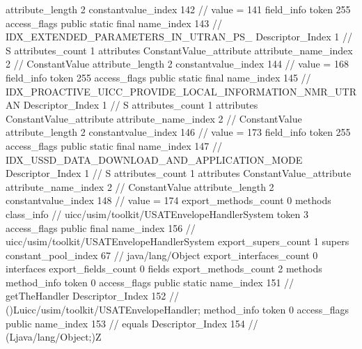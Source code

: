 {{{{{{{					attribute_length	2
					constantvalue_index	142		// value = 141
				}
				}
			}
			field_info {
				token	255
				access_flags	public static final
				name_index	143		// IDX_EXTENDED_PARAMETERS_IN_UTRAN_PS_
				Descriptor_Index	1		// S
				attributes_count	1
				attributes {
				ConstantValue_attribute {
					attribute_name_index	2		// ConstantValue
					attribute_length	2
					constantvalue_index	144		// value = 168
				}
				}
			}
			field_info {
				token	255
				access_flags	public static final
				name_index	145		// IDX_PROACTIVE_UICC_PROVIDE_LOCAL_INFORMATION_NMR_UTRAN
				Descriptor_Index	1		// S
				attributes_count	1
				attributes {
				ConstantValue_attribute {
					attribute_name_index	2		// ConstantValue
					attribute_length	2
					constantvalue_index	146		// value = 173
				}
				}
			}
			field_info {
				token	255
				access_flags	public static final
				name_index	147		// IDX_USSD_DATA_DOWNLOAD_AND_APPLICATION_MODE
				Descriptor_Index	1		// S
				attributes_count	1
				attributes {
				ConstantValue_attribute {
					attribute_name_index	2		// ConstantValue
					attribute_length	2
					constantvalue_index	148		// value = 174
				}
				}
			}
			}
			export_methods_count	0
			methods {
			}
		}
		class_info {		// uicc/usim/toolkit/USATEnvelopeHandlerSystem
			token	3
			access_flags	public final
			name_index	156		// uicc/usim/toolkit/USATEnvelopeHandlerSystem
			export_supers_count	1
			supers {
				constant_pool_index	67		// java/lang/Object
			}
			export_interfaces_count	0
			interfaces {
			}
			export_fields_count	0
			fields {
			}
			export_methods_count	2
			methods {
				method_info {
					token	0
					access_flags	public static
					name_index	151		// getTheHandler
					Descriptor_Index	152		// ()Luicc/usim/toolkit/USATEnvelopeHandler;
				}
				method_info {
					token	0
					access_flags	public
					name_index	153		// equals
					Descriptor_Index	154		// (Ljava/lang/Object;)Z
				}
			}
		}
	}
}
